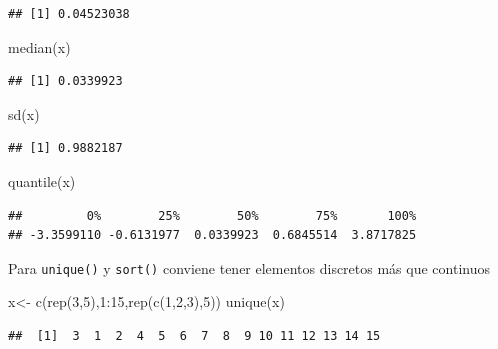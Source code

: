 \documentclass[
]{book}
\newenvironment{Shaded}{\begin{snugshade}}{\end{snugshade}}
\newcommand{\DecValTok}[1]{\textcolor[rgb]{0.00,0.00,0.81}{#1}}
\newcommand{\FunctionTok}[1]{\textcolor[rgb]{0.00,0.00,0.00}{#1}}
\newcommand{\NormalTok}[1]{#1}
\newcommand{\OtherTok}[1]{\textcolor[rgb]{0.56,0.35,0.01}{#1}}
\newcommand{\SpecialCharTok}[1]{\textcolor[rgb]{0.00,0.00,0.00}{#1}}
\begin{document}
\begin{verbatim}
## [1] 0.04523038
\end{verbatim}

\begin{Shaded}
\begin{Highlighting}[]
\FunctionTok{median}\NormalTok{(x)}
\end{Highlighting}
\end{Shaded}

\begin{verbatim}
## [1] 0.0339923
\end{verbatim}

\begin{Shaded}
\begin{Highlighting}[]
\FunctionTok{sd}\NormalTok{(x)}
\end{Highlighting}
\end{Shaded}

\begin{verbatim}
## [1] 0.9882187
\end{verbatim}

\begin{Shaded}
\begin{Highlighting}[]
\FunctionTok{quantile}\NormalTok{(x)}
\end{Highlighting}
\end{Shaded}

\begin{verbatim}
##         0%        25%        50%        75%       100% 
## -3.3599110 -0.6131977  0.0339923  0.6845514  3.8717825
\end{verbatim}

Para \texttt{unique()} y \texttt{sort()} conviene tener elementos discretos más que continuos

\begin{Shaded}
\begin{Highlighting}[]
\NormalTok{x}\OtherTok{\textless{}{-}} \FunctionTok{c}\NormalTok{(}\FunctionTok{rep}\NormalTok{(}\DecValTok{3}\NormalTok{,}\DecValTok{5}\NormalTok{),}\DecValTok{1}\SpecialCharTok{:}\DecValTok{15}\NormalTok{,}\FunctionTok{rep}\NormalTok{(}\FunctionTok{c}\NormalTok{(}\DecValTok{1}\NormalTok{,}\DecValTok{2}\NormalTok{,}\DecValTok{3}\NormalTok{),}\DecValTok{5}\NormalTok{))}
\FunctionTok{unique}\NormalTok{(x)}
\end{Highlighting}
\end{Shaded}

\begin{verbatim}
##  [1]  3  1  2  4  5  6  7  8  9 10 11 12 13 14 15
\end{verbatim}
\end{document}
